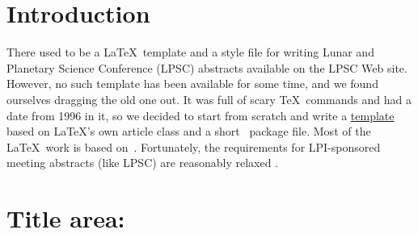 \documentclass[twoside, 10pt]{article}
\begin{document}



%

%

\balance{}

\vspace{4cm}
\section*{Introduction}
There used to be a \LaTeX\ template and a style file for writing
Lunar and Planetary Science Conference (LPSC) abstracts available
on the LPSC Web site.  However, no such template has been available
for some time, and we found ourselves dragging the old one out.  It
was full of scary \TeX\ commands and had a date from 1996 in it,
so we decided to start from scratch and write a
\href{https://github.com/MosesAstro/LaTeX_Templates/tree/master/LPSCAbstractLaTeXTemplate}{template} based
on \LaTeX's own article class and a short \LaTeXe\ package file.
Most of the \LaTeX\ work is based on~\cite{kopka2003guide}. Fortunately, the 
requirements for LPI-sponsored meeting abstracts (like LPSC)
are reasonably relaxed \citep{LPSC}.

\section*{Title area:}
\end{document}
